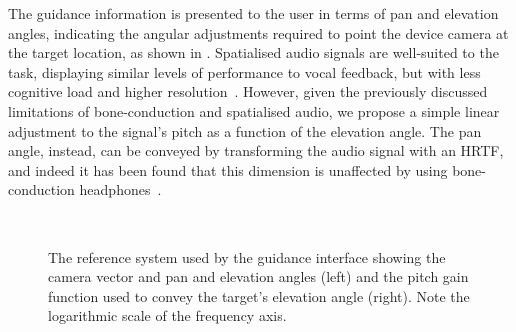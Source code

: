\documentclass[]{interact}
\begin{document}
The guidance information is presented to the user in terms of pan and elevation angles, indicating the angular adjustments required to point the device camera at the target location, as shown in .
Spatialised audio signals are well-suited to the task, displaying similar levels of performance to vocal feedback, but with less cognitive load and higher resolution~\citep{klatzky2006cognitive}.
However, given the previously discussed limitations of bone-conduction and spatialised audio, we propose a simple linear adjustment to the signal's pitch as a function of the elevation angle. 
The pan angle, instead, can be conveyed by transforming the audio signal with an HRTF, and indeed it has been found that this dimension is unaffected by using bone-conduction headphones~\citep{schonstein2008comparison,macdonald2006spatial,stanley2006lateralization}. 

\begin{figure}[t]
  \centering
~
  \caption{The reference system used by the guidance interface showing the camera vector and pan and elevation angles (left) and the pitch gain function used to convey the target's elevation angle (right). Note the logarithmic scale of the frequency axis. }
\end{figure}
\end{document}
